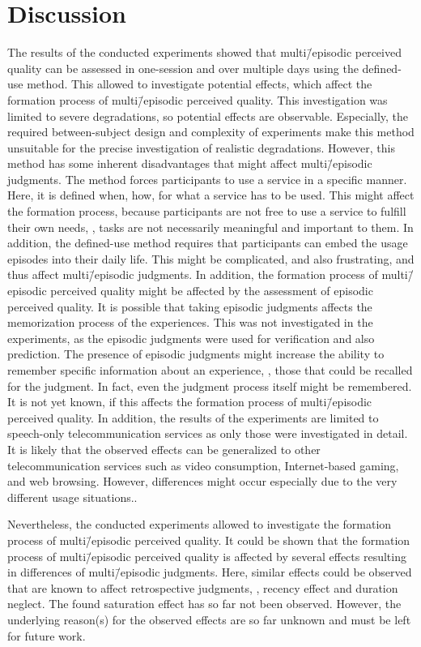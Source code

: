 \section{Discussion}
The results of the conducted experiments showed that multi\=/episodic perceived quality can be assessed in one-session and over multiple days using the defined-use method.
This allowed to investigate potential effects, which affect the formation process of multi\=/episodic perceived quality.
This investigation was limited to severe degradations, so potential effects are observable.
Especially, the required between-subject design and complexity of experiments make this method unsuitable for the precise investigation of realistic degradations.
However, this method has some inherent disadvantages that might affect multi\=/episodic judgments.
The method forces participants to use a service in a specific manner.
Here, it is defined when, how, for what a service has to be used.
This might affect the formation process, because participants are not free to use a service to fulfill their own needs, \ie, tasks are not necessarily meaningful and important to them.
In addition, the defined-use method requires that participants can embed the usage episodes into their daily life.
This might be complicated, and also frustrating, and thus affect multi\=/episodic judgments.
In addition, the formation process of multi\=/episodic perceived quality might be affected by the assessment of episodic perceived quality.
It is possible that taking episodic judgments affects the memorization process of the experiences.
This was not investigated in the experiments, as the episodic judgments were used for verification and also prediction.
The presence of episodic judgments might increase the ability to remember specific information about an experience, \ie, those that could be recalled for the judgment.
In fact, even the judgment process itself might be remembered.
It is not yet known, if this affects the formation process of multi\=/episodic perceived quality.
In addition, the results of the experiments are limited to speech-only telecommunication services as only those were investigated in detail.
It is likely that the observed effects can be generalized to other telecommunication services such as video consumption, Internet-based gaming, and web browsing.
However, differences might occur especially due to the very different usage situations..

Nevertheless, the conducted experiments allowed to investigate the formation process of multi\=/episodic perceived quality.
It could be shown that the formation process of multi\=/episodic perceived quality is affected by several effects resulting in differences of multi\=/episodic judgments.
Here, similar effects could be observed that are known to affect retrospective judgments, \ie, recency effect and duration neglect.
The found saturation effect has so far not been observed.
However, the underlying reason(s) for the observed effects are so far unknown and must be left for future work.

